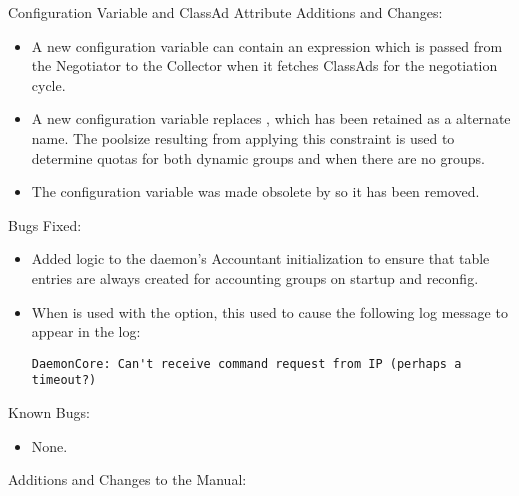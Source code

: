 \noindent Configuration Variable and ClassAd Attribute Additions and Changes:

\begin{itemize}

\item A new configuration variable  
can contain an expression which is passed from the Negotiator to the 
Collector when it fetches ClassAds for the negotiation cycle. 

\item A new configuration variable  
replaces , which has been retained as a
alternate name.  The poolsize resulting from applying this constraint is used
to determine quotas for both dynamic groups and when there are no groups.

\item The configuration variable  
was made obsolete by  so it has been removed.

\end{itemize}

\noindent Bugs Fixed:

\begin{itemize}

\item Added logic to the  daemon's Accountant
initialization to ensure that table entries are always created for
accounting groups on startup and reconfig.

\item When  is used with the  option, this
used to cause the following log message to appear in the 
log:
\begin{verbatim}
DaemonCore: Can't receive command request from IP (perhaps a timeout?)
\end{verbatim}

\end{itemize}

\noindent Known Bugs:

\begin{itemize}

\item None.

\end{itemize}

\noindent Additions and Changes to the Manual:

